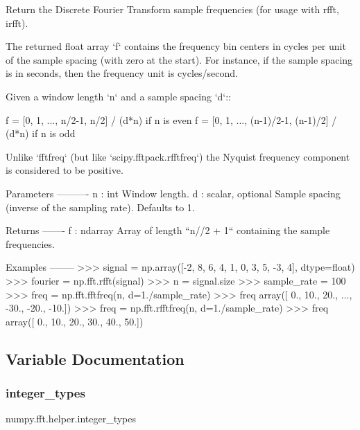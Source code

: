 \begin{DoxyVerb}Return the Discrete Fourier Transform sample frequencies
(for usage with rfft, irfft).

The returned float array `f` contains the frequency bin centers in cycles
per unit of the sample spacing (with zero at the start).  For instance, if
the sample spacing is in seconds, then the frequency unit is cycles/second.

Given a window length `n` and a sample spacing `d`::

  f = [0, 1, ...,     n/2-1,     n/2] / (d*n)   if n is even
  f = [0, 1, ..., (n-1)/2-1, (n-1)/2] / (d*n)   if n is odd

Unlike `fftfreq` (but like `scipy.fftpack.rfftfreq`)
the Nyquist frequency component is considered to be positive.

Parameters
----------
n : int
    Window length.
d : scalar, optional
    Sample spacing (inverse of the sampling rate). Defaults to 1.

Returns
-------
f : ndarray
    Array of length ``n//2 + 1`` containing the sample frequencies.

Examples
--------
>>> signal = np.array([-2, 8, 6, 4, 1, 0, 3, 5, -3, 4], dtype=float)
>>> fourier = np.fft.rfft(signal)
>>> n = signal.size
>>> sample_rate = 100
>>> freq = np.fft.fftfreq(n, d=1./sample_rate)
>>> freq
array([  0.,  10.,  20., ..., -30., -20., -10.])
>>> freq = np.fft.rfftfreq(n, d=1./sample_rate)
>>> freq
array([  0.,  10.,  20.,  30.,  40.,  50.])\end{DoxyVerb}
 

\subsection{Variable Documentation}
\mbox{\label{namespacenumpy_1_1fft_1_1helper_aff459c0f23cb7dfcae7703efc7b3f6ca}} 
\subsubsection{\texorpdfstring{integer\+\_\+types}{integer\_types}}
{\footnotesize\ttfamily numpy.\+fft.\+helper.\+integer\+\_\+types}


